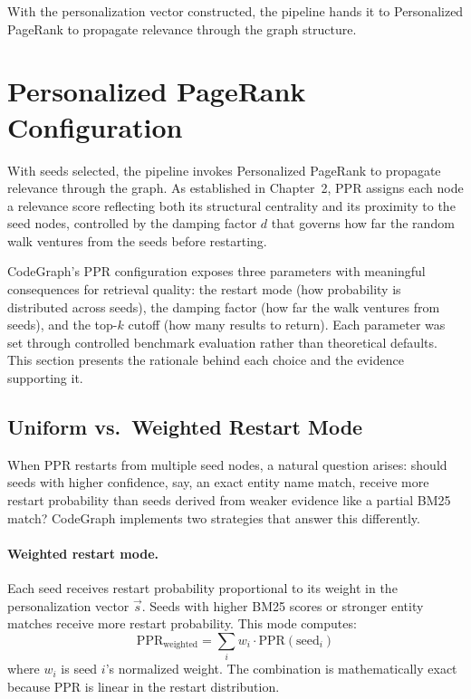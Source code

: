 With the personalization vector constructed, the pipeline hands it to Personalized PageRank to propagate relevance through the graph structure.


\section{Personalized PageRank Configuration}
\label{sec:ppr-config}

With seeds selected, the pipeline invokes Personalized PageRank to propagate relevance through the graph. As established in Chapter~2, PPR assigns each node a relevance score reflecting both its structural centrality and its proximity to the seed nodes, controlled by the damping factor $d$ that governs how far the random walk ventures from the seeds before restarting.

CodeGraph's PPR configuration exposes three parameters with meaningful consequences for retrieval quality: the restart mode (how probability is distributed across seeds), the damping factor (how far the walk ventures from seeds), and the top-$k$ cutoff (how many results to return). Each parameter was set through controlled benchmark evaluation rather than theoretical defaults. This section presents the rationale behind each choice and the evidence supporting it.

\subsection{Uniform vs.\ Weighted Restart Mode}
\label{sec:uniform-vs-weighted}

When PPR restarts from multiple seed nodes, a natural question arises: should seeds with higher confidence, say, an exact entity name match, receive more restart probability than seeds derived from weaker evidence like a partial BM25 match? CodeGraph implements two strategies that answer this differently.

\paragraph{Weighted restart mode.} Each seed receives restart probability proportional to its weight in the personalization vector $\vec{s}$. Seeds with higher BM25 scores or stronger entity matches receive more restart probability. This mode computes:
\begin{equation}
    \text{PPR}_{\text{weighted}} = \sum_i w_i \cdot \text{PPR}(\text{seed}_i)
    \label{eq:weighted-ppr}
\end{equation}
where $w_i$ is seed $i$'s normalized weight. The combination is mathematically exact because PPR is linear in the restart distribution.

